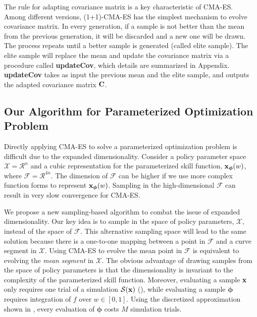 The rule for adapting covariance matrix is a key characteristic of
CMA-ES.  Among different versions, (1+1)-CMA-ES \cite{Igel:2006:CEG}
has the simplest mechanism to evolve covariance matrix. In every
generation, if a sample is not better than the mean from the previous
generation, it will be discarded and a new one will be drawn. The
process repeats until a better sample is generated (called elite
sample). The elite sample will replace the mean and update the
covariance matrix via a procedure called \textbf{updateCov}, which
details are summarized in Appendix. \textbf{updateCov} takes as
input the previous mean and the elite sample, and outputs the adapted
covariance matrix $\mathbf{C}$. 
 

\subsection{Our Algorithm for Parameterized Optimization Problem}
\label{sec:optskills_our_algorithm}
Directly applying CMA-ES to solve a parameterized optimization problem
is difficult due to the expanded dimensionality. Consider a policy
parameter space $\mathcal{X} = \mathcal{R}^n$ and a cubic
representation for the parameterized skill function,
$\mathbf{x}_{\boldsymbol{\phi}}(w)$, where $\mathcal{F} =
\mathcal{R}^{4n}$. The dimension of $\mathcal{F}$ can be higher if we
use more complex function forms to represent
$\mathbf{x}_{\boldsymbol{\phi}}(w)$. Sampling in the high-dimensional
$\mathcal{F}$ can result in very slow convergence for CMA-ES.

We propose a new sampling-based algorithm to combat the issue of
expanded dimensionality. Our key idea is to sample in the space of
policy parameters, $\mathcal{X}$, instead of the space of
$\mathcal{F}$. This alternative sampling space will lead to the same solution
because there is a one-to-one mapping between a point in $\mathcal{F}$
and a curve segment in $\mathcal{X}$. Using CMA-ES to evolve the
mean point in $\mathcal{F}$ is equivalent to evolving the \emph{mean
  segment} in $\mathcal{X}$.  The obvious advantage of drawing
samples from the space of policy parameters is that the dimensionality
is invariant to the complexity of the parameterized skill
function. Moreover, evaluating a sample $\mathbf{x}$ only requires one
trial of a simulation $\mathcal{S}(\mathbf{x})$ (), while evaluating a sample $\boldsymbol{\phi}$ requires
integration of $f$ over $w \in [0,1]$.  Using the discretized
approximation shown in , every evaluation of
$\boldsymbol{\phi}$ costs $M$ simulation trials.
 
